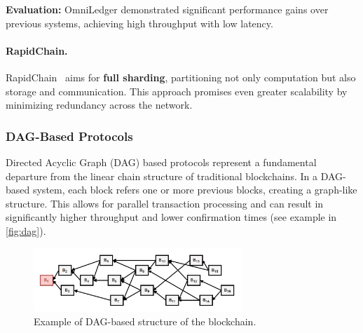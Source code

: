 \textbf{Evaluation:} OmniLedger demonstrated significant performance
gains over previous systems, achieving high throughput with low latency.


\paragraph{RapidChain.}\label{rapidchain}

RapidChain~\cite{zamani2018rapidchain} aims for \textbf{full sharding}, partitioning not only
computation but also storage and communication. This approach promises
even greater scalability by minimizing redundancy across the network.


\subsubsection{DAG-Based Protocols}\label{dag-based-protocols}

Directed Acyclic Graph (DAG) based protocols represent a fundamental
departure from the linear chain structure of traditional blockchains. In
a DAG-based system, each block refers one or more previous
blocks, creating a graph-like structure. This allows for parallel
transaction processing and can result in significantly higher throughput
and lower confirmation times (see example in \autoref{fig:dag}).


\begin{figure}[t]
	\begin{center}
		\includegraphics[width=0.7\textwidth]{./figs/DAG.png}
		\caption{Example of DAG-based structure of the blockchain.}		
		\label{fig:dag}
	\end{center}	
\end{figure}

